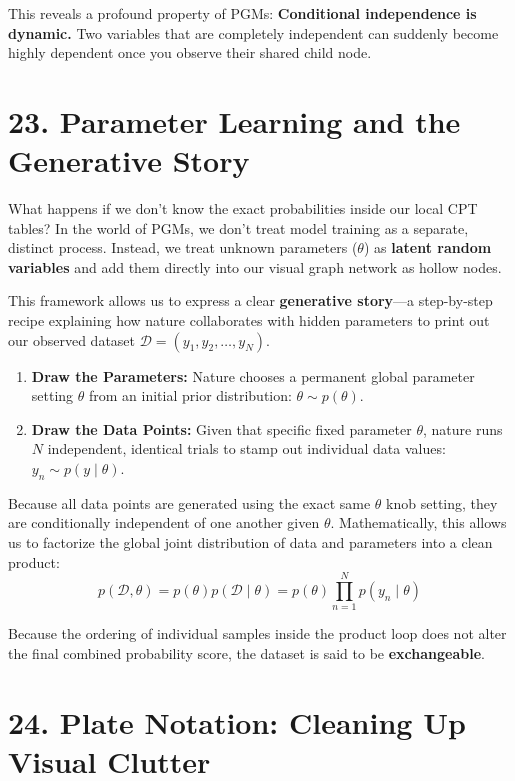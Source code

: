 \documentclass{article}
\begin{document}
This reveals a profound property of PGMs: \textbf{Conditional independence is dynamic.} Two variables that are completely independent can suddenly become highly dependent once you observe their shared child node.


\section*{23. Parameter Learning and the Generative Story}

What happens if we don't know the exact probabilities inside our local CPT tables? In the world of PGMs, we don't treat model training as a separate, distinct process. Instead, we treat unknown parameters ($\theta$) as \textbf{latent random variables} and add them directly into our visual graph network as hollow nodes.

This framework allows us to express a clear \textbf{generative story}—a step-by-step recipe explaining how nature collaborates with hidden parameters to print out our observed dataset $\mathcal{D} = (y_1, y_2, \dots, y_N)$.

\begin{enumerate}
    \item \textbf{Draw the Parameters:} Nature chooses a permanent global parameter setting $\theta$ from an initial prior distribution: $\theta \sim p(\theta)$.
    \item \textbf{Draw the Data Points:} Given that specific fixed parameter $\theta$, nature runs $N$ independent, identical trials to stamp out individual data values: $y_n \sim p(y \mid \theta)$.
\end{enumerate}

Because all data points are generated using the exact same $\theta$ knob setting, they are conditionally independent of one another given $\theta$. Mathematically, this allows us to factorize the global joint distribution of data and parameters into a clean product:
\begin{equation}
p(\mathcal{D}, \theta) = p(\theta) p(\mathcal{D} \mid \theta) = p(\theta) \prod_{n=1}^N p(y_n \mid \theta) \tag{145}
\end{equation}

Because the ordering of individual samples inside the product loop does not alter the final combined probability score, the dataset is said to be \textbf{exchangeable}.


\section*{24. Plate Notation: Cleaning Up Visual Clutter}
\end{document}

